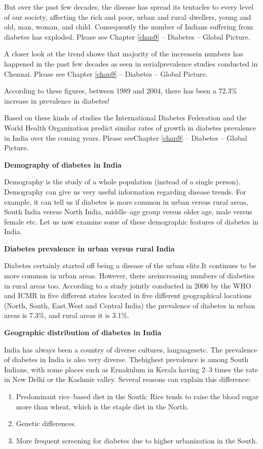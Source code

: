 But over the past few decades, the disease has spread its tentacles to every level of our society, affecting the rich and poor, urban and rural–dwellers, young and old, man, woman, and child. Consequently the number of Indians suffering from diabetes has exploded. Please see Chapter \ref{chap9} – Diabetes – Global Picture.

A closer look at the trend shows that majority of the increase\break in numbers has happened in the past few decades as seen in serial\break prevalence studies conducted in Chennai. Please see Chapter \ref{chap9} – Dia\-betes – Global Picture.

According to these figures, between 1989 and 2004, there has been a 72.3\% increase in prevalence in diabetes!

Based on these kinds of studies the International Diabetes Federation and the World Health Organization predict similar rates of growth in diabetes prevalence in India over the coming years. Please see\break Chapter \ref{chap9} – Diabetes – Global Picture.

\noindent\textbf{Demography of diabetes in India}

Demography is the study of a whole population (instead of a single person). Demography can give us very useful information regarding disease trends. For example, it can tell us if diabetes is more common in urban versus rural areas, South India versus North India, middle–age group versus older age, male versus female etc. Let us now examine some of these demographic features of diabetes in India.

\noindent\textbf{Diabetes prevalence in urban versus rural India}

Diabetes certainly started off being a disease of the urban elite.\break It continues to be more common in urban areas. However, there are\break increasing numbers of diabetics in rural areas too. According to a study jointly conducted in 2006 by the WHO and ICMR in five different states located in five different geographical locations (North, South, East,\break West and Central India) the prevalence of diabetes in urban areas is 7.3\%, and rural areas it is 3.1\%.

\noindent\textbf{Geographic distribution of diabetes in India}

India has always been a country of diverse cultures, languages\break etc. The prevalence of diabetes in India is also very diverse. The\break highest prevalence is among South Indians, with some places such as Ernakulum in Kerala having 2–3 times the rate in New Delhi or the Kashmir valley. Several reasons can explain this difference:
\vspace{-\topsep}
\begin{enumerate}[•]
\itemsep=0pt
\item Predominant rice–based diet in the South: Rice tends to raise the blood sugar more than wheat, which is the staple diet in the North.
\item Genetic differences.
\item More frequent screening for diabetes due to higher urbanization in the South.
\end{enumerate}
\vspace{-\topsep}

